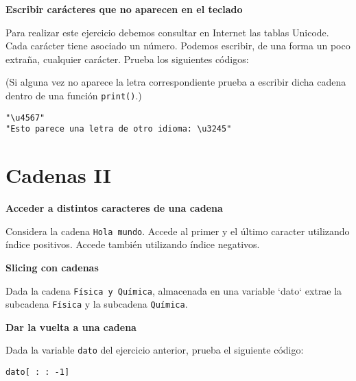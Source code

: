 \documentclass[a4paper, 11pt]{scrartcl}
\newenvironment{code}{\begin{tcolorbox}[colback=red!2!white]}{\end{tcolorbox}}
\begin{document}
\noindent\textbf{\sffamily \dag{}  Escribir carácteres que no aparecen en el teclado}

Para realizar este ejercicio debemos consultar en Internet las tablas Unicode. Cada carácter tiene asociado un número. Podemos escribir, de una forma un poco extraña, cualquier carácter. Prueba los siguientes códigos:

(Si alguna vez no aparece la letra correspondiente prueba a escribir dicha cadena dentro de una función \verb|print()|.)

\smallskip

\begin{code}

\begin{verbatim}
"\u4567"
"Esto parece una letra de otro idioma: \u3245"
\end{verbatim}

\end{code}


\newpage

\section{Cadenas II}




\noindent\textbf{\sffamily Acceder a distintos caracteres de una cadena}

Considera la cadena \verb|Hola mundo|.  Accede al primer y el último caracter utilizando índice positivos. Accede también utilizando índice negativos.






\noindent\textbf{\sffamily Slicing con cadenas}

Dada la cadena \verb|Física y Química|, almacenada en una variable `dato` extrae la subcadena \verb|Física| y la subcadena \verb|Química|.







\noindent\textbf{\sffamily \dag{} Dar la vuelta a una cadena}

Dada la variable \verb|dato| del ejercicio anterior, prueba el siguiente código:

\smallskip

\begin{code}

\begin{verbatim}
dato[ : : -1]
\end{verbatim}

\end{code}
\end{document}
